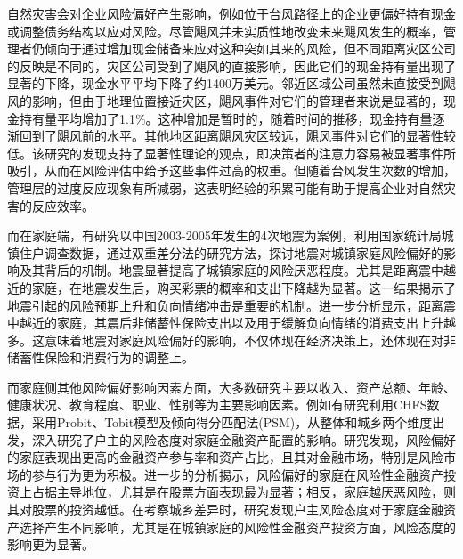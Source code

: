自然灾害会对企业风险偏好产生影响，例如位于台风路径上的企业更偏好持有现金\citep{杨娜娜2019自然灾害与企业现金持有}或调整债务结构\citep{shao2024typhoons}以应对风险。尽管飓风并未实质性地改变未来飓风发生的概率，管理者仍倾向于通过增加现金储备来应对这种突如其来的风险\citep{0Do}，但不同距离灾区公司的反映是不同的，灾区公司受到了飓风的直接影响，因此它们的现金持有量出现了显著的下降，现金水平平均下降了约1400万美元。邻近区域公司虽然未直接受到飓风的影响，但由于地理位置接近灾区，飓风事件对它们的管理者来说是显著的，现金持有量平均增加了1.1\%。这种增加是暂时的，随着时间的推移，现金持有量逐渐回到了飓风前的水平。其他地区距离飓风灾区较远，飓风事件对它们的显著性较低。该研究的发现支持了显著性理论的观点，即决策者的注意力容易被显著事件所吸引，从而在风险评估中给予这些事件过高的权重。但随着台风发生次数的增加，管理层的过度反应现象有所减弱，这表明经验的积累可能有助于提高企业对自然灾害的反应效率。

而在家庭端，有研究以中国2003-2005年发生的4次地震为案例，利用国家统计局城镇住户调查数据，通过双重差分法的研究方法，探讨地震对城镇家庭风险偏好的影响及其背后的机制\citep{章元0地震冲击对风险偏好的影响}。地震显著提高了城镇家庭的风险厌恶程度。尤其是距离震中越近的家庭，在地震发生后，购买彩票的概率和支出下降越为显著。这一结果揭示了地震引起的风险预期上升和负向情绪冲击是重要的机制。进一步分析显示，距离震中越近的家庭，其震后非储蓄性保险支出以及用于缓解负向情绪的消费支出上升越多。这意味着地震对家庭风险偏好的影响，不仅体现在经济决策上，还体现在对非储蓄性保险和消费行为的调整上。

而家庭侧其他风险偏好影响因素方面，大多数研究主要以收入\citep{石双2018收入与风险偏好}、资产总额\citep{卢亚娟殷君瑶2021户主风险态度对家庭金融资产配置的影响研究}、年龄\citep{王晶2021年龄结构}、健康状况\citep{雷晓燕2010中国家庭的资产组合选择}、教育程度\citep{梁立俊2018受教育程度与主客观风险偏好}、职业\citep{赵颖2017中国劳动者的风险偏好与职业选择}、性别\citep{徐小华2019女性劳动参与会影响家庭资产配置风险偏好吗}等为主要影响因素。例如有研究利用CHFS数据，采用Probit、Tobit模型及倾向得分匹配法(PSM)，从整体和城乡两个维度出发，深入研究了户主的风险态度对家庭金融资产配置的影响\citep{卢亚娟殷君瑶2021户主风险态度对家庭金融资产配置的影响研究}。研究发现，风险偏好的家庭表现出更高的金融资产参与率和资产占比，且其对金融市场，特别是风险市场的参与行为更为积极。进一步的分析揭示，风险偏好的家庭在风险性金融资产投资上占据主导地位，尤其是在股票方面表现最为显著；相反，家庭越厌恶风险，则其对股票的投资越低。在考察城乡差异时，研究发现户主风险态度对于家庭金融资产选择产生不同影响，尤其是在城镇家庭的风险性金融资产投资方面，风险态度的影响更为显著。

